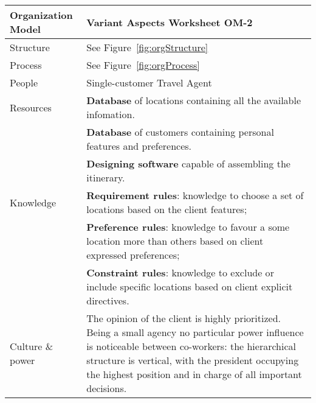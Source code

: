 \begin{tabular}%
       {|p{3cm}%
        |p{9.5cm}|}
\hline
{\bf Organization Model} &
   {\bf Variant Aspects Worksheet OM-2} \\
\hline
\hline
\sc Structure &
   {\rm
   See Figure~\ref{fig:orgStructure}
   } \\ %
\hline
\sc Process &
   {\rm
   See Figure~\ref{fig:orgProcess}
   } \\ %
\hline
\sc People &
   {\rm
   Single-customer Travel Agent
   } \\
\hline
\sc Resources &
   {\rm \textbf{Database} of locations containing all the available infomation.} \\
 & {\rm \textbf{Database} of customers containing personal features and preferences.} \\
 & {\rm \textbf{Designing software} capable of assembling the itinerary.} \\
\hline
\sc Knowledge &
   {\rm \textbf{Requirement rules}: knowledge to choose a set of locations based on the client features;} \\
 & {\rm \textbf{Preference rules}: knowledge to favour a some location more than others based on client expressed preferences;}\\
 & {\rm \textbf{Constraint rules}: knowledge to exclude or include specific locations based on client explicit directives.}\\
\hline
\sc Culture \& power &
   {\rm The opinion of the client is highly prioritized. Being a small agency no particular power influence is noticeable between co-workers: the hierarchical structure is vertical, with the president occupying the highest position and in charge of all important decisions.} \\
\hline
\end{tabular}



